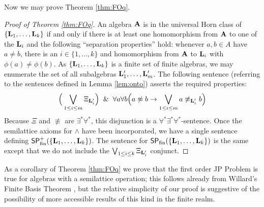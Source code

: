\documentclass[10pt,a4paper]{amsart}
\theoremstyle{plain}
\theoremstyle{definition}
\begin{document}
Now we may prove Theorem \ref{thm:FOq}.
\begin{proof}[Proof of Theorem \ref{thm:FOq}]
An algebra ${\bf A}$ is in the universal Horn class of $\{{\bf L}_1,\dots,{\bf L}_k\}$ if and only if  there is at least one homomorphism from ${\bf A}$ to one of the ${\bf L}_i$ and the following ``separation properties'' hold: whenever $a,b\in A$ have $a\neq b$, there is an $i\in\{1,\dots,k\}$ and homomorphism from ${\bf A}$ to ${\bf L}_i$ with $\phi(a)\neq \phi(b)$.  As $\{{\bf L}_1,\dots,{\bf L}_k\}$ is a finite set of finite algebras, we may enumerate the set of all subalgebras ${\bf L}'_1,\dots, {\bf L}_m'$.  The following sentence (referring to the sentences defined in Lemma \ref{lem:onto}) asserts the required properties:
\[
\Big(\bigvee_{1\leq i\leq m}\Xi_{{\bf L}'_i}\Big)\And \forall a\forall b \Big(a\not\approx b\rightarrow \bigvee_{1\leq i\leq m}a\not\equiv_{{\bf L}'_i} b\Big)
\]
Because $\Xi$ and $\not\equiv$ are $\exists^*\forall^*$, this disjunction is a $\forall^*\exists^*\forall^*$-sentence.  Once the semilattice axioms for $\wedge$ have been incorporated, we have a single sentence defining $\mathsf{SP}_{\rm fin}^+(\{{\bf L}_1,\dots,{\bf L}_k\})$.  The sentence for $\mathsf{SP}_{\rm fin}(\{{\bf L}_1,\dots,{\bf L}_k\})$ is the same except that we do not  include the $\bigvee_{1\leq i\leq k}\Xi_{{\bf L}'_i}$ conjunct.
\end{proof}

As a corollary of Theorem \ref{thm:FOq} we prove that the first order JP Problem is true for algebras with a semilattice operation; this follows already from Willard's Finite Basis Theorem \cite{wil}, but the relative simplicity of our proof is suggestive of the possibility of more accessible results of this kind in the finite realm.
\end{document}
